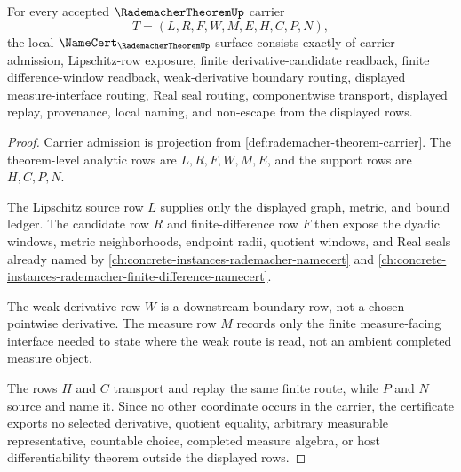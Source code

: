 \begin{theorem}
\label{thm:rademacher-theorem-namecert-obligations}
For every accepted $\RademacherTheoremUp$ carrier
$$
T=(L,R,F,W,M,E,H,C,P,N),
$$
the local $\NameCert_{\RademacherTheoremUp}$ surface consists exactly of carrier admission, Lipschitz-row exposure, finite derivative-candidate readback, finite difference-window readback, weak-derivative boundary routing, displayed measure-interface routing, Real seal routing, componentwise transport, displayed replay, provenance, local naming, and non-escape from the displayed rows.
\end{theorem}
\begin{proof}
Carrier admission is projection from \autoref{def:rademacher-theorem-carrier}. The theorem-level analytic rows are $L,R,F,W,M,E$, and the support rows are $H,C,P,N$.

The Lipschitz source row $L$ supplies only the displayed graph, metric, and bound ledger. The candidate row $R$ and finite-difference row $F$ then expose the dyadic windows, metric neighborhoods, endpoint radii, quotient windows, and Real seals already named by \autoref{ch:concrete-instances-rademacher-namecert} and \autoref{ch:concrete-instances-rademacher-finite-difference-namecert}.

The weak-derivative row $W$ is a downstream boundary row, not a chosen pointwise derivative. The measure row $M$ records only the finite measure-facing interface needed to state where the weak route is read, not an ambient completed measure object.

The rows $H$ and $C$ transport and replay the same finite route, while $P$ and $N$ source and name it. Since no other coordinate occurs in the carrier, the certificate exports no selected derivative, quotient equality, arbitrary measurable representative, countable choice, completed measure algebra, or host differentiability theorem outside the displayed rows.
\end{proof}

